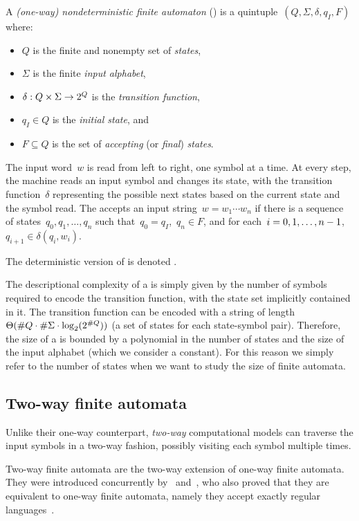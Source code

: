 \begin{defn}
	A \emph{(one-way) nondeterministic finite automaton} (\ONFA) is a quintuple~$(Q,\Sigma,\delta,q_I,F)$ where:
	\begin{itemize}
		\item $Q$ is the finite and nonempty set of \emph{states},
		\item $\Sigma$ is the finite \emph{input alphabet},
		\item $\delta:Q\times\Sigma\to2^{Q}$ is the \emph{transition function},
		\item $q_I\in Q$ is the \emph{initial state}, and
		\item $F\subseteq Q$ is the set of \emph{accepting} (or \emph{final}) \emph{states}.
	\end{itemize}
	The input word~$w$ is read from left to right, one symbol at a time.
	At every step, the machine reads an input symbol and changes its state, with the transition function~$\delta$ representing the possible next states based on the current state and the symbol read.
	The \ONFA accepts an input string~$w=w_1\cdots w_n$ if there is a sequence of states~$q_0,q_1,\dots,q_n$ such that~$q_0=q_I$,~$q_n\in F$, and for each~$i=0,1,\dots,n-1$,~$q_{i+1}\in\delta(q_i,w_i)$.

	\noindent The deterministic version of \ONFAs is denoted \ODFAs.
\end{defn}

The descriptional complexity of a \ONFA is simply given by the number of symbols required to encode the transition function, with the state set implicitly contained in it.
The transition function can be encoded with a string of length~$\Theta(\# Q\cdot\# \Sigma\cdot\log_2(2^{\# Q}))$ (a set of states for each state-symbol pair).
Therefore, the size of a \ONFA is bounded by a polynomial in the number of states and the size of the input alphabet (which we consider a constant).
For this reason we simply refer to the number of states when we want to study the size of finite automata.


\subsection{Two-way finite automata}
Unlike their one-way counterpart, \emph{two-way} computational models can traverse the input symbols in a two-way fashion, possibly visiting each symbol multiple times.

Two-way finite automata are the two-way extension of one-way finite automata.
They were introduced concurrently by~\citeauthor{RabSco59} and~\citeauthor{She59}, who also proved that they are equivalent to one-way finite automata, namely they accept exactly regular languages~\cite{RabSco59,She59}.

